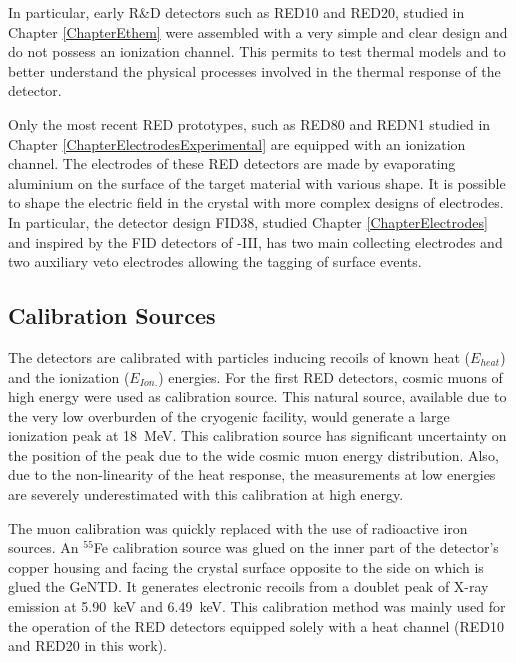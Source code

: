 In particular, early R\&D detectors such as RED10 and RED20, studied in Chapter \ref{ChapterEthem} were assembled with a very simple and clear design and do not possess an ionization channel. This permits to test thermal models and to better understand the physical processes involved in the thermal response of the detector.

Only the most recent RED prototypes, such as RED80 and REDN1 studied in Chapter \ref{ChapterElectrodesExperimental} are equipped with an ionization channel.
The electrodes of these RED detectors are made by evaporating aluminium on the surface of the target material with various shape. It is possible to shape the electric field in the crystal with more complex designs of electrodes. In particular, the detector design FID38, studied Chapter \ref{ChapterElectrodes} and inspired by the FID detectors of \Edelweiss{}-III, has two main collecting electrodes and two auxiliary veto electrodes allowing the tagging of surface events.





\subsection{Calibration Sources}
\label{par:calibration-source}
\label{par:calibration-sources}

The detectors are calibrated with particles inducing recoils of known heat ($E_{heat}$) and the ionization ($E_{Ion.}$) energies.
For the first RED detectors, cosmic muons of high energy were used as calibration source. This natural source, available due to the very low overburden of the cryogenic facility, would generate a large ionization peak at \SI{18}{\mega\eV}. This calibration source has significant uncertainty on the position of the peak due to the wide cosmic muon energy distribution. Also, due to the non-linearity of the heat response, the measurements at low energies are severely underestimated with this calibration at high energy.

The muon calibration was quickly replaced with the use of radioactive iron sources.
An $^{55}$Fe calibration source was glued on the inner part of the detector's copper housing and facing the crystal surface opposite to the side on which is glued the GeNTD. It generates electronic recoils from a doublet peak of X-ray emission at \SI{5.90}{\kilo\eV} and \SI{6.49}{\kilo\eV}. This calibration method was mainly used for the operation of the RED detectors equipped solely with a heat channel (RED10 and RED20 in this work).

